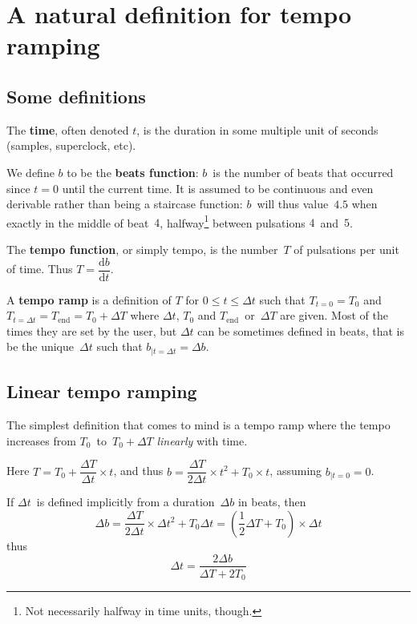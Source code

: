 \documentclass[10pt]{article}
\begin{document}
\def\define#1{\textbf{#1}}
\def\d{\mathrm{d}}

\section{A natural definition for tempo ramping}

\subsection{Some definitions}

The \define{time}, often denoted $t$, is the duration in some multiple unit of
seconds (samples, superclock, etc).

We define $b$ to be the \define{beats function}: $b$~is the number of beats that
occurred since $t = 0$ until the current time. It is assumed to be continuous and
even derivable rather than being a staircase function: $b$~will thus value~$4.5$
when exactly in the middle of beat~$4$, halfway\footnote{Not necessarily halfway
in time units, though.} between pulsations $4$~and~$5$.

The \define{tempo function}, or simply tempo, is the number~$T$ of pulsations
per unit of time. Thus $T = \dfrac{\d b}{\d t}$.

\def\DT{\Delta T}
\def\Dt{\Delta t}
\def\Db{\Delta b}

A \define{tempo ramp} is a definition of $T$ for $0 \le t \le \Dt$ such that
$T_{t=0} = T_0$ and $T_{t=\Dt} = T_{\text{end}} = T_0 + \DT$ where $\Dt$, $T_0$
and $T_{\text{end}}$~or~$\DT$ are given. Most of the times they are set by the
user, but $\Dt$ can be sometimes defined in beats, that is be the unique~$\Dt$
such that $b_{|t=\Dt} = \Db$.

\subsection{Linear tempo ramping}

The simplest definition that comes to mind is a tempo ramp where the tempo
increases from $T_0$~to~$T_0 + \DT$ \emph{linearly} with time.

Here $T = T_0 + \dfrac{\DT}{\Dt}\times t$, and thus
$b = \dfrac{\DT}{2\Dt}\times t^2 + T_0 \times t$, assuming $b_{|t=0} = 0$.

If $\Dt$~is defined implicitly from a duration~$\Db$ in beats, then
\[ \Db = \dfrac{\DT}{2\Dt}\times \Dt^2 + T_0 \Dt
  = \left( \frac{1}{2}\DT + T_0 \right) \times\Dt \]
thus
\[
    \Dt = \dfrac{2\Db}{\DT + 2T_0}
\]
\end{document}
